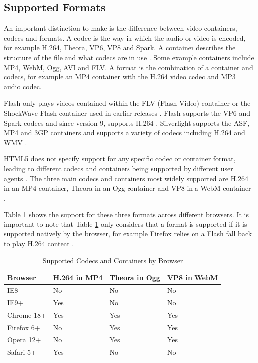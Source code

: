 \documentclass[journal]{IEEEtran}
\begin{document}
\subsection{Supported Formats}
An important distinction to make is the difference between video containers, codecs and formats. A codec is the way in which the audio or video is encoded, for example H.264, Theora, VP6, VP8 and Spark. A container describes the structure of the file and what codecs are in use \cite{website:videoFormatsGuide}. Some example containers include MP4, WebM, Ogg, AVI and FLV. A format is the combination of a container and codecs, for example an MP4 container with the H.264 video codec and MP3 audio codec.

Flash only plays videos contained within the FLV (Flash Video) container or the ShockWave Flash container used in earlier releases \cite{article:flashPlayer}. Flash supports the VP6 and Spark codecs and since version 9, supports H.264 \cite{article:flashPlayer}\cite{website:flashSupportedFormats}. Silverlight supports the ASF, MP4 and 3GP containers and supports a variety of codecs including H.264 and WMV \cite{website:silverlightSupportedFormats}.

HTML5 does not specify support for any specific codec or container format, leading to different codecs and containers being supported by different user agents \cite{article:towardsVideoOnTheWebWithHTML5}. The three main codecs and containers most widely supported are H.264 in an MP4 container, Theora in an Ogg container and VP8 in a WebM container \cite{article:towardsVideoOnTheWebWithHTML5}.

Table \ref{tab:supportedCodecsAndContainers} shows the support for these three formats across different browsers. It is important to note that Table \ref{tab:supportedCodecsAndContainers} only considers that a format is supported if it is supported natively by the browser, for example Firefox relies on a Flash fall back to play H.264 content \cite{website:firefoxVideoMobileAndTheOpenWeb}.

\begin{table}
	\caption{Supported Codecs and Containers by Browser \cite{inproceedings:applicationOfHTML5Multimedia}\cite{article:towardsVideoOnTheWebWithHTML5}}
	\label{tab:supportedCodecsAndContainers}
	\centering
  \begin{tabular}{|l|l|l|l|}
    \hline
    \textbf{Browser}    & \textbf{H.264 in MP4} & \textbf{Theora in Ogg} & \textbf{VP8 in WebM} \\ \hline
    IE8        & No           & No            & No          \\ \hline
    IE9+       & Yes          & No            & No          \\ \hline
    Chrome 18+ & Yes          & Yes           & Yes         \\ \hline
    Firefox 6+ & No           & Yes           & Yes         \\ \hline
    Opera 12+  & No           & Yes           & Yes         \\ \hline
    Safari 5+  & Yes          & No            & No          \\ \hline
  \end{tabular}
\end{table}
\end{document}
